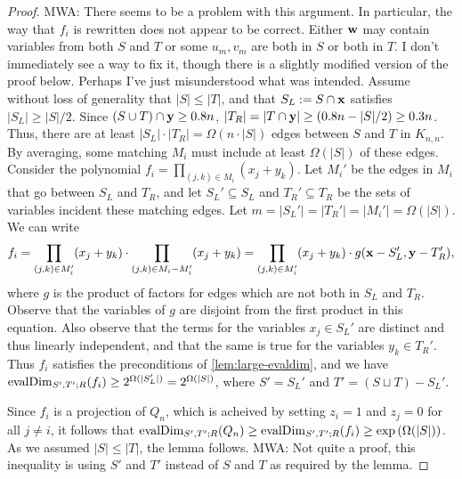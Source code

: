 \documentclass[11pt]{article}
\newcommand{\Mattnote}[1]{\textcolor{OliveGreen}{MWA: #1}}
\newcommand{\BLnote}[1]{\textcolor{Blue}{BLV: #1}}
\providecommand{\DIFadd}[1]{{\protect\color{blue}\uwave{#1}}} %
\providecommand{\DIFaddbegin}{} %
\providecommand{\DIFaddend}{} %
\begin{document}
\begin{proof}
\Mattnote{There seems to be a problem with this argument.  In particular, the way that $f_i$ is rewritten does not appear to be correct.  Either $\vecw$ may contain variables from both $S$ and $T$ or some $u_m, v_m$ are both in $S$ or both in $T$.  I don't immediately see a way to fix it, though there is a slightly modified version of the proof below.  Perhaps I've just misunderstood what was intended.}
\DIFaddbegin \DIFadd{\BLnote{There was a slight inaccuracy but the main point is that the edges that go between $S$ and $T$ guarantee enough independent polynomials in the subspace of $S$ evaluations. $u_m, v_m$ cannot be both in $S$ or $T$ because we picked only edges between $S$ and $T$. $\vecw$ can contain $S$ variables but we can always fix those in advance and keep $g(\vecw)$ non-zero so that's not a major problem. I think your fix is also along the same lines, but I fixed the original proof in a way that would match the statement of the lemma}
}\DIFaddend Assume without loss of generality that $|S| \leq |T|$, and that $S_L := S \cap \mathbf{x}$ satisfies $|S_L| \geq |S|/2$.
Since $(S \cup T) \cap \mathbf{y} \ge 0.8n$, $|T_R| = \left| T \cap \mathbf{y} \right| \geq (0.8n - |S|/2) \geq 0.3 n$.
Thus, there are at least $|S_L|\cdot|T_R| = \Omega(n\cdot  |S|)$ edges between $S$ and $T$ in $K_{n,n}$. 
By averaging, some matching $M_i$ must include at least $\Omega(|S|)$ of these edges. Consider the polynomial $f_i = \prod_{(j,k)\in M_i} (x_j + y_k)$.  Let $M_i'$ be the edges in $M_i$ that go between $S_L$ and $T_R$, and let $S_L' \subseteq S_L$ and $T_R' \subseteq T_R$ be the sets of variables incident these matching edges.  Let $m = |S_L'| = |T_R'| = |M_i'| = \Omega(|S|)$.    We can write
\[
f_i = \prod_{(j,k) \in M_i'} (x_j + y_k) \cdot \prod_{(j,k) \in M_i - M_i'} (x_j + y_k) =  \prod_{(j,k) \in M_i'} (x_j + y_k) \cdot g(\mathbf{x} - S_L', \mathbf{y} - T_R'),
\]
where $g$ is the product of factors for edges which are not both in $S_L$ and $T_R$.  Observe that the variables of $g$ are disjoint from the first product in this equation.  Also observe that the terms for the variables $x_j \in S_L'$ are distinct and thus linearly independent, and that the same is true for the variables $y_k \in T_R'$.  Thus $f_i$ satisfies the preconditions of \autoref{lem:large-evaldim}, and we have $\operatorname{evalDim}_{S',T';R}(f_i) \geq 2^{\Omega(|S_L'|)} = 2^{\Omega(|S|)}$, where $S' = S_L'$ and $T' = (S \sqcup T) - S_L'$.   

Since $f_i$ is a projection of $Q_n$, which is acheived by setting $z_i=1$ and $z_j=0$ for all $j \neq i$, it follows that $\operatorname{evalDim}_{S',T';R}(Q_n) \geq \operatorname{evalDim}_{S',T';R}(f_i) \geq \exp{(\Omega(|S|))}$.  As we assumed $|S| \le |T|$, the lemma follows.  \Mattnote{Not quite a proof, this inequality is using $S'$ and $T'$ instead of $S$ and $T$ as required by the lemma.}
\end{proof}
\end{document}
